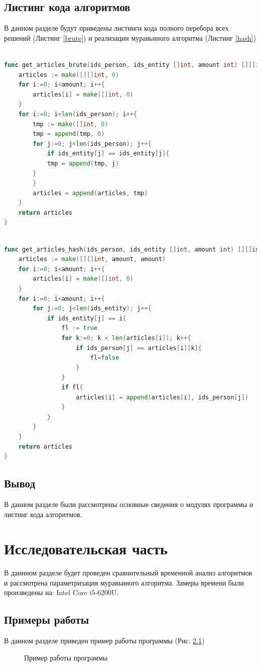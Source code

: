 \documentclass[12pt]{report}
\begin{document}
\section{Листинг кода алгоритмов}
В данном разделе будут приведены листинги кода полного перебора всех решений (Листинг \ref{brute}) и реализации муравьиного алгоритма (Листинг \ref{hash})
\begin{lstlisting}[label=brute,caption = Перебор всех возможных вариантов, language = go]

func get_articles_brute(ids_person, ids_entity []int, amount int) [][]int{
	articles := make([][]int, 0)
	for i:=0; i<amount; i++{
		articles[i] = make([]int, 0)
	}
	for i:=0; i<len(ids_person); i++{
		tmp := make([]int, 0)
		tmp = append(tmp, 0)
		for j:=0; j<len(ids_person); j++{
			if ids_entity[j] == ids_entity[j]{
			tmp = append(tmp, j)
		}		
		}
		articles = append(articles, tmp)
	}
	return articles
}
\end{lstlisting}

\begin{lstlisting}[label=hash,caption = Муравьиный алгоритм, language = go]

func get_articles_hash(ids_person, ids_entity []int, amount int) [][]int{
	articles := make([][]int, amount, amount)
	for i:=0; i<amount; i++{
		articles[i] = make([]int, 0)
	}
	for i:=0; i<amount; i++{
		for j:=0; j<len(ids_entity); j++{
			if ids_entity[j] == i{
				fl := true
				for k:=0; k < len(articles[i]); k++{
					if ids_person[j] == articles[i][k]{
						fl=false
					}
				}
				if fl{
					articles[i] = append(articles[i], ids_person[j])
				}
			}		
		}
	}
	return articles
} 
\end{lstlisting}
\section*{Вывод}
В данном разделе были рассмотрены основные сведения о модулях программы и листинг кода алгоритмов.

\chapter{Исследовательская часть}
В даннном разделе будет проведен сравнительный временной анализ алгоритмов и рассмотрена параметризация муравьиного алгоритма. Замеры времени были произведены на: Intel Core i5-6200U.
\section{Примеры работы}
В данном разделе приведен пример работы программы (Рис. \ref{ris:example})
\begin{figure}[h]
	\caption{Пример работы программы}
	\label{ris:example}
\end{figure}
\end{document}
